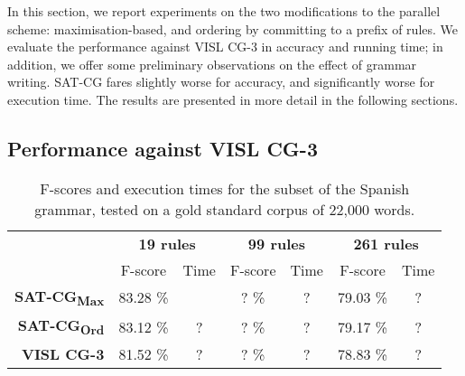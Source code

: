In this section, we report experiments on the two modifications to the parallel scheme: maximisation-based, and ordering by committing to a prefix of rules.
We evaluate the performance against VISL CG-3 in accuracy and running time; in addition, we offer some preliminary observations on the effect of grammar writing.
SAT-CG fares slightly worse for accuracy, and significantly worse for execution time.
The results are presented in more detail in the following sections.




\def\satcgMax{SAT-CG\textsubscript{Max}}
\def\satcgOrd{SAT-CG\textsubscript{Ord}}

\subsection{Performance against VISL CG-3}


\begin{table}[h]
\centering
\begin{tabular}{r | c c | c c | c c}
 
           & \multicolumn{2}{c}{\textbf{19 rules}} &  \multicolumn{2}{c}{\textbf{99 rules}} & \multicolumn{2}{c}{\textbf{261 rules}} \\ 
                          & F-score  & Time   &  F-score & Time    & F-score  & Time \\ \hline
      \textbf{\satcgMax}  & 83.28 \% &        &  ? \%    & ?       & 79.03 \% & ?\\ 
      \textbf{\satcgOrd}  & 83.12 \% & ?      &  ? \%    & ?       & 79.17 \% & ?\\ 
      \textbf{VISL CG-3}  & 81.52 \% & ?      &  ? \%    & ?       & 78.83 \% & ?\\ 
  \end{tabular}
\caption{F-scores and execution times for the subset of the Spanish grammar, tested on a gold standard corpus of 22,000 words.}
  \label{table:fscore}
\end{table}


